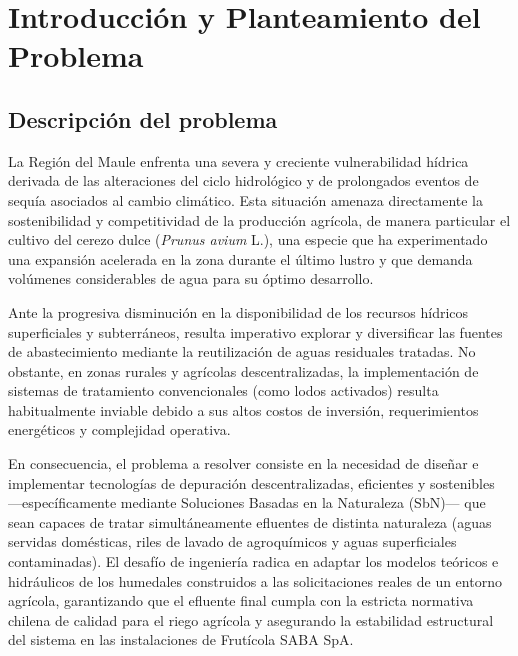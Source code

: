 \documentclass[12pt, letterpaper]{report}
\begin{document}


\chapter{Introducción y Planteamiento del Problema}

\section{Descripción del problema}

La Región del Maule enfrenta una severa y creciente vulnerabilidad hídrica derivada de las alteraciones del ciclo hidrológico y de prolongados eventos de sequía asociados al cambio climático. Esta situación amenaza directamente la sostenibilidad y competitividad de la producción agrícola, de manera particular el cultivo del cerezo dulce (\textit{Prunus avium} L.), una especie que ha experimentado una expansión acelerada en la zona durante el último lustro y que demanda volúmenes considerables de agua para su óptimo desarrollo. 

Ante la progresiva disminución en la disponibilidad de los recursos hídricos superficiales y subterráneos, resulta imperativo explorar y diversificar las fuentes de abastecimiento mediante la reutilización de aguas residuales tratadas. No obstante, en zonas rurales y agrícolas descentralizadas, la implementación de sistemas de tratamiento convencionales (como lodos activados) resulta habitualmente inviable debido a sus altos costos de inversión, requerimientos energéticos y complejidad operativa.

En consecuencia, el problema a resolver consiste en la necesidad de diseñar e implementar tecnologías de depuración descentralizadas, eficientes y sostenibles ---específicamente mediante Soluciones Basadas en la Naturaleza (SbN)--- que sean capaces de tratar simultáneamente efluentes de distinta naturaleza (aguas servidas domésticas, riles de lavado de agroquímicos y aguas superficiales contaminadas). El desafío de ingeniería radica en adaptar los modelos teóricos e hidráulicos de los humedales construidos a las solicitaciones reales de un entorno agrícola, garantizando que el efluente final cumpla con la estricta normativa chilena de calidad para el riego agrícola y asegurando la estabilidad estructural del sistema en las instalaciones de Frutícola SABA SpA.
\end{document}
